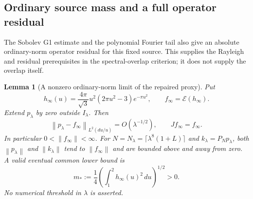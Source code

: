 \documentclass[11pt]{article}
\newtheorem{lemma}[theorem]{Lemma}
\theoremstyle{remark}
\newcommand{\norm}[1]{\left\lVert #1\right\rVert}
\begin{document}
\subsection*{Ordinary source mass and a full operator residual}
The Sobolev G1 estimate and the polynomial Fourier tail also give an
absolute ordinary-norm operator residual for this fixed source. This supplies the
Rayleigh and residual prerequisites in the spectral-overlap criterion;
it does not supply the overlap itself.

\begin{lemma}[A nonzero ordinary-norm limit of the repaired proxy]
\label{lem:v115-source-mass}
Put
\[
 h_\infty(u)=\frac{4\pi}{\sqrt3}u^2(2\pi u^2-3)e^{-\pi u^2},
 \qquad f_\infty=\mathcal E(h_\infty).
\]
Extend $p_\lambda$ by zero outside $I_\lambda$. Then
\begin{equation}\label{eq:v115-source-limit}
 \norm{p_\lambda-f_\infty}_{L^2(du/u)}=O(\lambda^{-1/2}),
 \qquad Jf_\infty=f_\infty.
\end{equation}
In particular $0<\norm{f_\infty}<\infty$. For
$N=N_\lambda=\lceil\lambda^8(1+L)\rceil$ and
$k_\lambda=P_Np_\lambda$, both $\norm{p_\lambda}$ and
$\norm{k_\lambda}$ tend to $\norm{f_\infty}$ and are bounded above
and away from zero. A valid eventual common lower bound is
\begin{equation}\label{eq:v115-mass-lower}
 m_*:=\frac14\left(\int_1^2h_\infty(u)^2\,du\right)^{1/2}>0.
\end{equation}
No numerical threshold in $\lambda$ is asserted.
\end{lemma}
\end{document}
